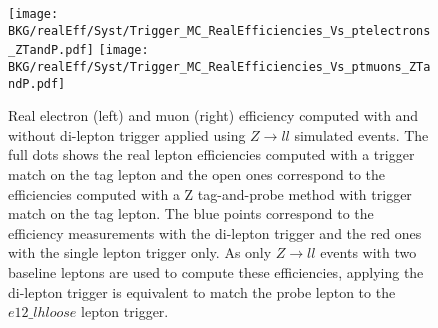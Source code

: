 	\begin{figure}[!h]
	  \begin{center} 
	   \texttt{[image: BKG/realEff/Syst/Trigger\_MC\_RealEfficiencies\_Vs\_ptelectrons\_ZTandP.pdf]} 
	   \texttt{[image: BKG/realEff/Syst/Trigger\_MC\_RealEfficiencies\_Vs\_ptmuons\_ZTandP.pdf]}
	   \caption{\label{fig:Syst_Trigger_Dep} Real electron (left) and muon (right) efficiency computed with and without di-lepton trigger applied using $Z\rightarrow ll$ simulated events. The full dots shows the real lepton efficiencies computed with a trigger match on the tag lepton and the open ones correspond to the efficiencies computed with a Z tag-and-probe method with trigger match on the tag lepton. The blue points correspond to the efficiency measurements with the di-lepton trigger and the red ones with the single lepton trigger only. As only $Z\rightarrow ll$ events with two baseline leptons are used to compute these efficiencies, applying the di-lepton trigger is equivalent to match the probe lepton to the $e12\_lhloose$ lepton trigger.}
	  \end{center}
	\end{figure}	
		
